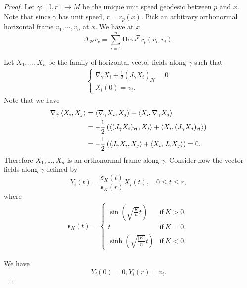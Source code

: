 \documentclass[11pt]{article}
\numberwithin{equation}{section}
\newcommand{\Ho}{\mathcal H}
\begin{document}
\begin{proof}
Let $\gamma:[0,r]\to M$ be the unique unit speed  geodesic between $p$ and $x$.  Note that since $\gamma$ has unit speed, $r=r_p(x)$. Pick an arbitrary orthonormal horizontal frame $v_1,\cdots,v_n$ at $x$. We have at $x$
\[
\Delta_\Ho r_p =\sum_{i=1}^n \mathrm{Hess}^\nabla r_p (v_i,v_i)  .
\]

Let $X_1,\ldots,X_n$ be the family of horizontal vector fields  along $\gamma$ such that
\begin{align*}
\begin{cases}
\nabla_{\dot \gamma}X_i+\frac{1}{2} (J_{\dot \gamma} X_i)_\mathcal{H}=0 \\
X_i(0)=v_i.
\end{cases}
\end{align*}
Note that we have
\begin{align}\label{skew connection}
\nabla_{\dot \gamma} \left\langle X_i, X_j \right\rangle& =  \left\langle \nabla_{\dot \gamma} X_i, X_j \right\rangle+\left\langle  X_i, \nabla_{\dot \gamma}X_j \right\rangle \\ \notag
 &=-\frac{1}{2}\left( \left\langle (J_{\dot \gamma} X_i)_\Ho, X_j \right\rangle+\left\langle  X_i, (J_{\dot \gamma} X_j)_\Ho\right\rangle\right) \\ \notag
 &=-\frac{1}{2}\left( \left\langle J_{\dot \gamma} X_i, X_j \right\rangle+\left\langle  X_i, J_{\dot \gamma} X_j\right\rangle\right) =0.
\end{align}
Therefore $X_1,\ldots,X_n$ is an orthonormal frame along $\gamma$.
Consider now the vector fields along $\gamma$ defined by
\[
Y_i(t)=\frac{\mathfrak{s}_K(t)}{\mathfrak{s}_K(r)} X_i(t), \quad 0\le t \le r,
\]
where
\begin{align*}
\mathfrak{s}_K(t)= 
\begin{cases}
 \sin \left(\sqrt { \frac{K}{n}} t \right) &\text{if}\ K>0,
\\
\displaystyle t &\text{if}\ K = 0,
\\
\sinh \left(\sqrt{\frac{|K|}{n}} t\right) &\text{if}\ K<0.
\end{cases}
\end{align*}

We have
\[
Y_i(0)=0, Y_i(r)=v_i.
\]


\end{proof}
\end{document}
